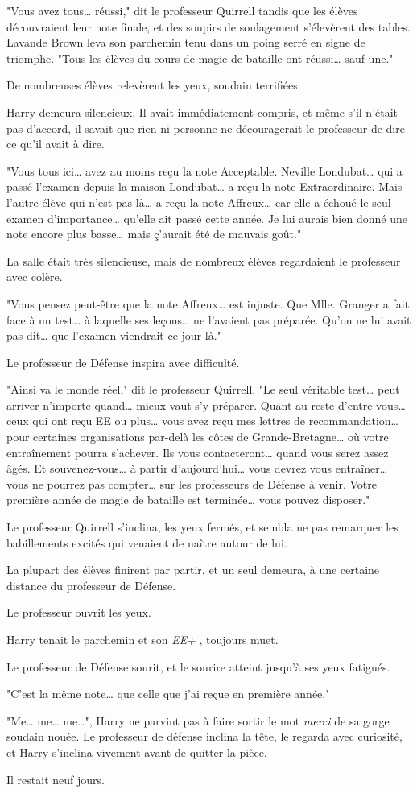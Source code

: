 "Vous avez tous… réussi," dit le professeur Quirrell tandis que les élèves découvraient leur note finale, et des soupirs de soulagement s'élevèrent des tables. Lavande Brown leva son parchemin tenu dans un poing serré en signe de triomphe. "Tous les élèves du cours de magie de bataille ont réussi… sauf une."

De nombreuses élèves relevèrent les yeux, soudain terrifiées.

Harry demeura silencieux. Il avait immédiatement compris, et même s'il n'était pas d'accord, il savait que rien ni personne ne découragerait le professeur de dire ce qu'il avait à dire.

"Vous tous ici… avez au moins reçu la note Acceptable. Neville Londubat… qui a passé l'examen depuis la maison Londubat… a reçu la note Extraordinaire. Mais l'autre élève qui n'est pas là… a reçu la note Affreux… car elle a échoué le seul examen d'importance… qu'elle ait passé cette année. Je lui aurais bien donné une note encore plus basse… mais ç'aurait été de mauvais goût."

La salle était très silencieuse, mais de nombreux élèves regardaient le professeur avec colère.

"Vous pensez peut-être que la note Affreux… est injuste. Que Mlle. Granger a fait face à un test… à laquelle ses leçons… ne l'avaient pas préparée. Qu'on ne lui avait pas dit… que l'examen viendrait ce jour-là."

Le professeur de Défense inspira avec difficulté.

"Ainsi va le monde réel," dit le professeur Quirrell. "Le seul véritable test… peut arriver n'importe quand… mieux vaut s'y préparer. Quant au reste d'entre vous… ceux qui ont reçu EE ou plus… vous avez reçu mes lettres de recommandation… pour certaines organisations par-delà les côtes de Grande-Bretagne… où votre entraînement pourra s'achever. Ils vous contacteront… quand vous serez assez âgés. Et souvenez-vous… à partir d'aujourd'hui… vous devrez vous entraîner… vous ne pourrez pas compter… sur les professeurs de Défense à venir. Votre première année de magie de bataille est terminée… vous pouvez disposer."

Le professeur Quirrell s'inclina, les yeux fermés, et sembla ne pas remarquer les babillements excités qui venaient de naître autour de lui.

La plupart des élèves finirent par partir, et un seul demeura, à une certaine distance du professeur de Défense.

Le professeur ouvrit les yeux.

Harry tenait le parchemin et son \emph{EE+} , toujours muet.

Le professeur de Défense sourit, et le sourire atteint jusqu'à ses yeux fatigués.

"C'est la même note… que celle que j'ai reçue en première année."

"Me… me… me…", Harry ne parvint pas à faire sortir le mot \emph{merci}  de sa gorge soudain nouée. Le professeur de défense inclina la tête, le regarda avec curiosité, et Harry s'inclina vivement avant de quitter la pièce.

Il restait neuf jours.

